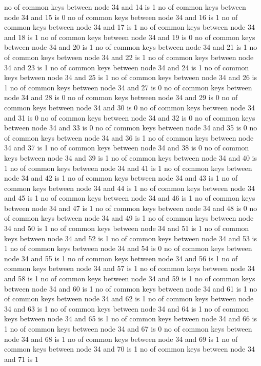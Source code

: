 no of common keys between node 34 and 14 is 1
no of common keys between node 34 and 15 is 0
no of common keys between node 34 and 16 is 1
no of common keys between node 34 and 17 is 1
no of common keys between node 34 and 18 is 1
no of common keys between node 34 and 19 is 0
no of common keys between node 34 and 20 is 1
no of common keys between node 34 and 21 is 1
no of common keys between node 34 and 22 is 1
no of common keys between node 34 and 23 is 1
no of common keys between node 34 and 24 is 1
no of common keys between node 34 and 25 is 1
no of common keys between node 34 and 26 is 1
no of common keys between node 34 and 27 is 0
no of common keys between node 34 and 28 is 0
no of common keys between node 34 and 29 is 0
no of common keys between node 34 and 30 is 0
no of common keys between node 34 and 31 is 0
no of common keys between node 34 and 32 is 0
no of common keys between node 34 and 33 is 0
no of common keys between node 34 and 35 is 0
no of common keys between node 34 and 36 is 1
no of common keys between node 34 and 37 is 1
no of common keys between node 34 and 38 is 0
no of common keys between node 34 and 39 is 1
no of common keys between node 34 and 40 is 1
no of common keys between node 34 and 41 is 1
no of common keys between node 34 and 42 is 1
no of common keys between node 34 and 43 is 1
no of common keys between node 34 and 44 is 1
no of common keys between node 34 and 45 is 1
no of common keys between node 34 and 46 is 1
no of common keys between node 34 and 47 is 1
no of common keys between node 34 and 48 is 0
no of common keys between node 34 and 49 is 1
no of common keys between node 34 and 50 is 1
no of common keys between node 34 and 51 is 1
no of common keys between node 34 and 52 is 1
no of common keys between node 34 and 53 is 1
no of common keys between node 34 and 54 is 0
no of common keys between node 34 and 55 is 1
no of common keys between node 34 and 56 is 1
no of common keys between node 34 and 57 is 1
no of common keys between node 34 and 58 is 1
no of common keys between node 34 and 59 is 1
no of common keys between node 34 and 60 is 1
no of common keys between node 34 and 61 is 1
no of common keys between node 34 and 62 is 1
no of common keys between node 34 and 63 is 1
no of common keys between node 34 and 64 is 1
no of common keys between node 34 and 65 is 1
no of common keys between node 34 and 66 is 1
no of common keys between node 34 and 67 is 0
no of common keys between node 34 and 68 is 1
no of common keys between node 34 and 69 is 1
no of common keys between node 34 and 70 is 1
no of common keys between node 34 and 71 is 1
